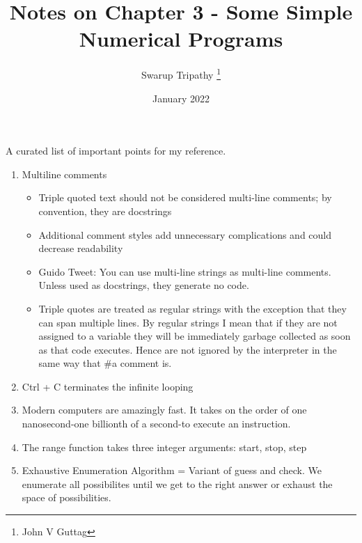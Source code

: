 \documentclass[12 pt, Letterpaper, twoside]{article}
\title{Notes on Chapter 3 - Some Simple Numerical Programs}
\author{Swarup Tripathy \thanks{John V Guttag}}
\date{January 2022}
\begin{document}
    \maketitle
    A curated list of important points for my reference.
    \begin{enumerate}
        \item Multiline comments
            \begin{itemize}
                \item Triple quoted text should not be considered multi-line comments; by convention, they are docstrings
                \item Additional comment styles add unnecessary complications and could decrease readability
                \item Guido Tweet: You can use multi-line strings as multi-line comments. Unless used as docstrings, they generate no code.
                \item Triple quotes are treated as regular strings with the exception that they can span multiple lines. 
                By regular strings I mean that if they are not assigned to a variable they will be immediately garbage collected as soon as that code executes. 
                Hence are not ignored by the interpreter in the same way that #a comment is.
            \end{itemize}
        \item Ctrl + C terminates the infinite looping 
        \item Modern computers are amazingly fast. It takes on the order of one nanosecond-one billionth of a second-to execute an instruction.
        \item The range function takes three integer arguments: start, stop, step
        \item Exhaustive Enumeration Algorithm = Variant of guess and check. We enumerate all possibilites until we get to the right answer or exhaust the space of possibilities.
    \end{enumerate}
\end{document}

